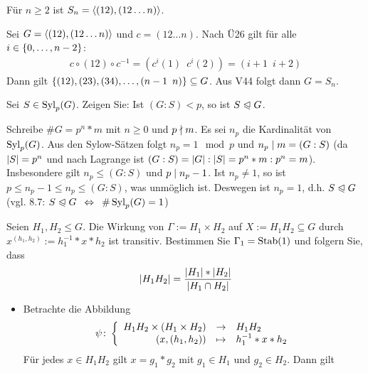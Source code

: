 \begin{exercisePage}
%
\setcounter{taskcount}{46}
%
\begin{exercise}
	Für $n \geq 2$ ist $S_n=\langle (12),(12 \dots n) \rangle$.
\end{exercise}
\begin{solution}
	Sei $G = \langle (12), (12\dots n) \rangle$ und $c = (12 \dots n)$. Nach Ü26 gilt für alle $i \in \left\{ 0, \dots, n-2 \right\}$: 
	\begin{align*}
		c \circ (12) \circ c^{-1} = (c^i(1) \enspace c^i(2) ) = (i+1 \enspace i+2)
	\end{align*}
	Dann gilt $\left\{ (12),(23),(34), \dots , (n-1 \enspace n) \right\} \subseteq G$. Aus V44 folgt dann $G = S_n$.
\end{solution}
%
\begin{exercise}
	Sei $S \in \operatorname{Syl}_p(G)$. Zeigen Sie: Ist $(G:S) < p$, so ist $S \mathrel{\trianglelefteqslant} G$.
\end{exercise}
\begin{solution}
	Schreibe $\# G = p^n * m$ mit $n \geq 0$ und $p \mathrel{\nmid} m$. Es sei $n_p$ die Kardinalität von $\operatorname{Syl}_p(G)$. Aus den Sylow-Sätzen folgt $n_p = 1 \mod p$ und $n_p \mathrel{\mid} m = (G:S)$ (da $\left| S \right| = p^n$ und nach Lagrange ist $(G:S) = \left| G \right| : \left| S \right| = p^n*m : p^n =m$). Insbesondere gilt $n_p \leq (G:S)$ und $p \mathrel{\mid} n_p -1$. Ist $n_p \neq 1$, so ist $p \leq n_p -1 \leq n_p \leq (G:S)$, was unmöglich ist. Deswegen ist $n_p = 1$, d.h. $S \mathrel{\trianglelefteqslant} G$ (vgl. 8.7: $S \mathrel{\trianglelefteqslant} G \enspace \Leftrightarrow \enspace \# \operatorname{Syl}_p(G) = 1$)
\end{solution}
%
\begin{exercise}
	Seien $H_1, H_2 \leq G$. Die Wirkung von $\Gamma := H_1 \times H_2$ auf $X:=H_1 H_2 \subseteq G$ durch $x^{(h_1,h_2)} := h_1^{-1}*x*h_2$ ist transitiv. Bestimmen Sie $\Gamma_1 = \operatorname{Stab}(1)$ und folgern Sie, dass
	\begin{align*}
		\left| H_1 H_2 \right| = \frac{\left| H_1 \right| * \left| H_2 \right|}{\left| H_1 \cap H_2 \right|}
	\end{align*}
\end{exercise}
\begin{solution}
	\begin{itemize}[leftmargin=*]
		\item Betrachte die Abbildung
		\begin{equation*}
			\psi \colon \left\lbrace \begin{array}{rcl} H_1 H_2 \times (H_1 \times H_2) & \to & H_1 H_2 \\(x, (h_1,h_2)) & \mapsto & h_1^{-1}*x*h_2 \end{array} \right.
		\end{equation*}
		Für jedes $x \in H_1 H_2$ gilt $x = g_1*g_2$ mit $g_1 \in H_1$ und $g_2 \in H_2$. Dann gilt

\end{itemize}
\end{solution}
\end{exercisePage}
